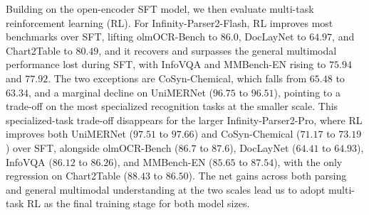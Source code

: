 Building on the open-encoder SFT model, we then evaluate multi-task reinforcement learning (RL). For Infinity-Parser2-Flash, RL improves most benchmarks over SFT, lifting olmOCR-Bench to $86.0$, DocLayNet to $64.97$, and Chart2Table to $80.49$, and it recovers and surpasses the general multimodal performance lost during SFT, with InfoVQA and MMBench-EN rising to $75.94$ and $77.92$. The two exceptions are CoSyn-Chemical, which falls from $65.48$ to $63.34$, and a marginal decline on UniMERNet ($96.75$ to $96.51$), pointing to a trade-off on the most specialized recognition tasks at the smaller scale. This specialized-task trade-off disappears for the larger Infinity-Parser2-Pro, where RL improves both UniMERNet ($97.51$ to $97.66$) and CoSyn-Chemical ($71.17$ to $73.19$) over SFT, alongside olmOCR-Bench ($86.7$ to $87.6$), DocLayNet ($64.41$ to $64.93$), InfoVQA ($86.12$ to $86.26$), and MMBench-EN ($85.65$ to $87.54$), with the only regression on Chart2Table ($88.43$ to $86.50$). The net gains across both parsing and general multimodal understanding at the two scales lead us to adopt multi-task RL as the final training stage for both model sizes.

\begin{table}[htbp]
\centering
\caption{Ablation on training strategies, comparing SFT (frozen or open ViT) and multi-task RL across seven benchmarks. The best result within each model group is in \textbf{bold}. The baselines for Infinity-Parser2-Flash and Infinity-Parser2-Pro are Qwen3.5-2B and Qwen3.5-35B-A3B, respectively.}
\label{tab:ablation_training_strategies}
\end{table}


